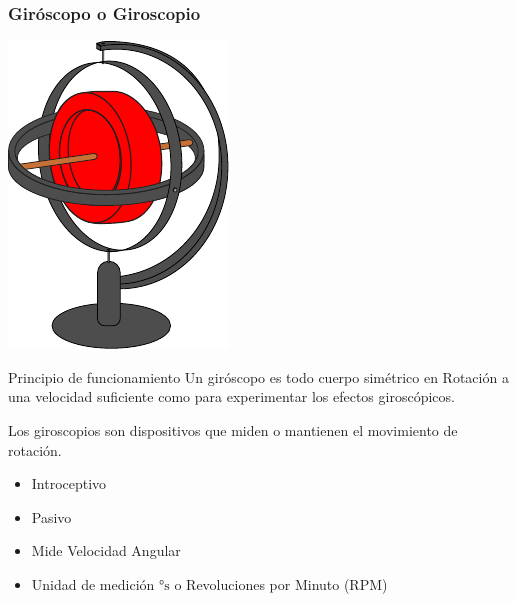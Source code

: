 \begin{frame}
    \frametitle{Giróscopo o Giroscopio}
    \scriptsize
    \begin{center}
        \includegraphics[width=0.2\columnwidth]{images/gyroscope.pdf}
    \end{center}

    \begin{block}{Principio de funcionamiento}
        Un giróscopo es todo cuerpo simétrico en Rotación a una velocidad suficiente como para experimentar los efectos giroscópicos.

        Los giroscopios son dispositivos que miden o mantienen el movimiento de rotación.
    \end{block}

    \begin{itemize}
        \item Introceptivo
        \item Pasivo
        \item Mide Velocidad Angular
        \item Unidad de medición $\si{\degree\second}$ o Revoluciones por Minuto (RPM)
    \end{itemize}


\end{frame}


